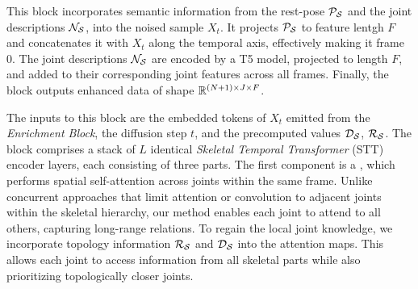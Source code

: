 

This block incorporates semantic information from the rest-pose $\mathcal{P}_{\mathcal{S}}$ and the joint descriptions $\mathcal{N}_{\mathcal{S}}$, into the noised sample $X_t$. 
It projects $\mathcal{P}_{\mathcal{S}}$ to feature lentgh $F$ and concatenates it with $X_t$ along the temporal axis, effectively making it frame 0. The joint descriptions $\mathcal{N}_{\mathcal{S}}$ are encoded by a T5 model, projected to length $F$, and added to their corresponding joint features across all frames.
Finally, the block outputs enhanced data of shape $\mathbb{R}^{(N+1) \times J \times F}$.
 
The inputs to this block are the embedded tokens of $X_t$ emitted from the \emph{Enrichment Block}, the diffusion step $t$, and the precomputed values $\mathcal{D}_{\mathcal{S}}$, $\mathcal{R}_{\mathcal{S}}$. 
The block comprises a stack of $L$ identical \emph{Skeletal Temporal Transformer} (STT) encoder layers, each consisting of three parts.
The first component is a \emph{\skelattn}, which performs spatial self-attention across joints within the same frame. Unlike concurrent approaches that limit attention or convolution to adjacent joints within the skeletal hierarchy, our method enables each joint to attend to all others, capturing long-range relations. To regain the local joint knowledge, we incorporate topology information $\mathcal{R}_{\mathcal{S}}$ and $\mathcal{D}_{\mathcal{S}}$ into the attention maps. This allows each joint to access information from all skeletal parts while also prioritizing topologically closer joints.


